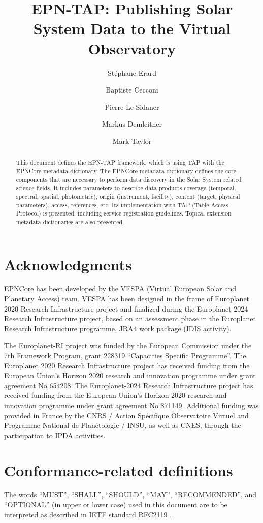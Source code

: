 \documentclass[11pt,a4paper]{ivoa}
\title{EPN-TAP: Publishing Solar System Data to the Virtual Observatory}
\author{St\'ephane Erard}
\author{Baptiste Cecconi}
\author{Pierre Le Sidaner}
\author{Markus Demleitner}
\author{Mark Taylor}
\begin{document}
\begin{abstract}
This document defines the EPN-TAP framework, which is using TAP with
the EPNCore metadata dictionary. The EPNCore metadata dictionary defines
the core components that are necessary to perform data discovery in the
Solar System related science fields. It includes parameters to describe
data products coverage (temporal, spectral, spatial, photometric), origin
(instrument, facility), content (target, physical parameters), access,
references, etc. Its implementation with TAP (Table Access Protocol) is
presented, including service registration guidelines. Topical extension
metadata dictionaries are also presented.
\end{abstract}


\section*{Acknowledgments}

EPNCore has been developed by the VESPA (Virtual European Solar
and Planetary Access) team.  VESPA has been designed in the frame of
Europlanet 2020 Research Infrastructure project and finalized
during the Europlanet 2024 Research Infrastructure project,
based on an assessment phase in the Europlanet Research Infrastructure
 programme, JRA4 work package (IDIS activity).

The Europlanet-RI project was funded by the European Commission under the
7th Framework Program, grant 228319 ``Capacities Specific Programme''.
The Europlanet 2020 Research Infrastructure project has
received funding from the European Union's Horizon 2020 research and
innovation programme under grant agreement No 654208.  The Europlanet-2024
Research Infrastructure project has received funding from
the European Union's Horizon 2020 research and innovation programme under
grant agreement No 871149.  Additional funding was provided in France by
the CNRS / Action Sp\'ecifique Observatoire Virtuel and Programme National
de Plan\'etologie / INSU, as well as CNES, through the participation to
IPDA activities.

\section*{Conformance-related definitions}

The words ``MUST'', ``SHALL'', ``SHOULD'', ``MAY'', ``RECOMMENDED'', and
``OPTIONAL'' (in upper or lower case) used in this document are to be
interpreted as described in IETF standard RFC2119 \citep{std:RFC2119}.
\end{document}
